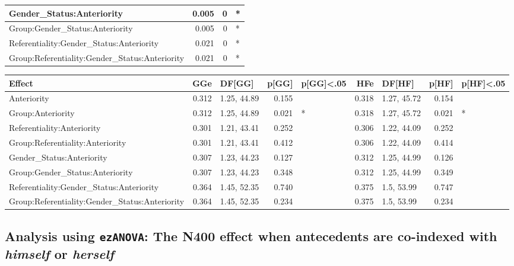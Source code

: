 \documentclass[
]{article}
\begin{document}
\begin{table}
\begin{tabular}[t]{l|r|r|l}
Gender\_Status:Anteriority & 0.005 & 0 & *\\
\hline
Group:Gender\_Status:Anteriority & 0.005 & 0 & *\\
\hline
Referentiality:Gender\_Status:Anteriority & 0.021 & 0 & *\\
\hline
Group:Referentiality:Gender\_Status:Anteriority & 0.021 & 0 & *\\
\hline
\end{tabular}
\centering
\begin{tabular}[t]{l|r|l|r|l|r|l|r|l}
\hline
Effect & GGe & DF[GG] & p[GG] & p[GG]<.05 & HFe & DF[HF] & p[HF] & p[HF]<.05\\
\hline
Anteriority & 0.312 & 1.25, 44.89 & 0.155 &  & 0.318 & 1.27, 45.72 & 0.154 & \\
\hline
Group:Anteriority & 0.312 & 1.25, 44.89 & 0.021 & * & 0.318 & 1.27, 45.72 & 0.021 & *\\
\hline
Referentiality:Anteriority & 0.301 & 1.21, 43.41 & 0.252 &  & 0.306 & 1.22, 44.09 & 0.252 & \\
\hline
Group:Referentiality:Anteriority & 0.301 & 1.21, 43.41 & 0.412 &  & 0.306 & 1.22, 44.09 & 0.414 & \\
\hline
Gender\_Status:Anteriority & 0.307 & 1.23, 44.23 & 0.127 &  & 0.312 & 1.25, 44.99 & 0.126 & \\
\hline
Group:Gender\_Status:Anteriority & 0.307 & 1.23, 44.23 & 0.348 &  & 0.312 & 1.25, 44.99 & 0.349 & \\
\hline
Referentiality:Gender\_Status:Anteriority & 0.364 & 1.45, 52.35 & 0.740 &  & 0.375 & 1.5, 53.99 & 0.747 & \\
\hline
Group:Referentiality:Gender\_Status:Anteriority & 0.364 & 1.45, 52.35 & 0.234 &  & 0.375 & 1.5, 53.99 & 0.234 & \\
\hline
\end{tabular}
\end{table}

\subsection{\texorpdfstring{Analysis using \texttt{ezANOVA}: The N400
effect when antecedents are co-indexed with \emph{himself} or
\emph{herself}}{Analysis using ezANOVA: The N400 effect when antecedents are co-indexed with himself or herself}}\label{analysis-using-ezanova-the-n400-effect-when-antecedents-are-co-indexed-with-himself-or-herself}
\end{document}
